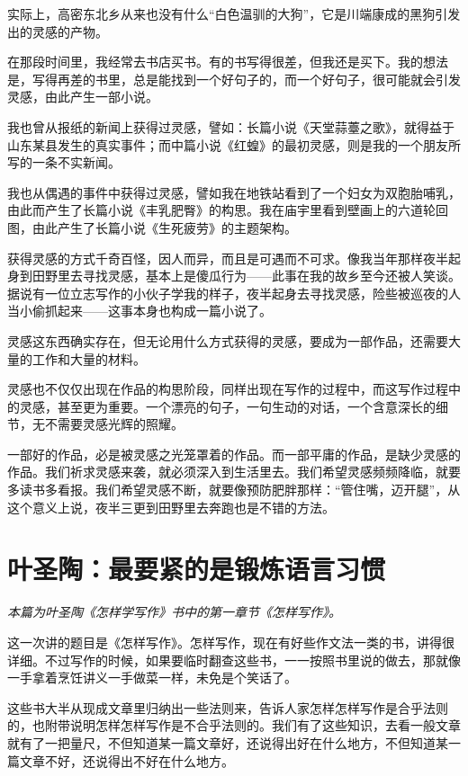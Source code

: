 \documentclass[12pt,a5paper]{ctexbook}
\begin{document}
实际上，高密东北乡从来也没有什么“白色温驯的大狗”，它是川端康成的黑狗引发出的灵感的产物。

在那段时间里，我经常去书店买书。有的书写得很差，但我还是买下。我的想法是，写得再差的书里，总是能找到一个好句子的，而一个好句子，很可能就会引发灵感，由此产生一部小说。

我也曾从报纸的新闻上获得过灵感，譬如：长篇小说《天堂蒜薹之歌》，就得益于山东某县发生的真实事件；而中篇小说《红蝗》的最初灵感，则是我的一个朋友所写的一条不实新闻。

我也从偶遇的事件中获得过灵感，譬如我在地铁站看到了一个妇女为双胞胎哺乳，由此而产生了长篇小说《丰乳肥臀》的构思。我在庙宇里看到壁画上的六道轮回图，由此产生了长篇小说《生死疲劳》的主题架构。

获得灵感的方式千奇百怪，因人而异，而且是可遇而不可求。像我当年那样夜半起身到田野里去寻找灵感，基本上是傻瓜行为——此事在我的故乡至今还被人笑谈。据说有一位立志写作的小伙子学我的样子，夜半起身去寻找灵感，险些被巡夜的人当小偷抓起来——这事本身也构成一篇小说了。

灵感这东西确实存在，但无论用什么方式获得的灵感，要成为一部作品，还需要大量的工作和大量的材料。

灵感也不仅仅出现在作品的构思阶段，同样出现在写作的过程中，而这写作过程中的灵感，甚至更为重要。一个漂亮的句子，一句生动的对话，一个含意深长的细节，无不需要灵感光辉的照耀。

一部好的作品，必是被灵感之光笼罩着的作品。而一部平庸的作品，是缺少灵感的作品。我们祈求灵感来袭，就必须深入到生活里去。我们希望灵感频频降临，就要多读书多看报。我们希望灵感不断，就要像预防肥胖那样：“管住嘴，迈开腿”，从这个意义上说，夜半三更到田野里去奔跑也是不错的方法。
\newpage

\section{叶圣陶：最要紧的是锻炼语言习惯}

\emph{本篇为叶圣陶《怎样学写作》书中的第一章节《怎样写作》。}
\vspace{2em}

这一次讲的题目是《怎样写作》。怎样写作，现在有好些作文法一类的书，讲得很详细。不过写作的时候，如果要临时翻查这些书，一一按照书里说的做去，那就像一手拿着烹饪讲义一手做菜一样，未免是个笑话了。

这些书大半从现成文章里归纳出一些法则来，告诉人家怎样怎样写作是合乎法则的，也附带说明怎样怎样写作是不合乎法则的。我们有了这些知识，去看一般文章就有了一把量尺，不但知道某一篇文章好，还说得出好在什么地方，不但知道某一篇文章不好，还说得出不好在什么地方。
\end{document}
